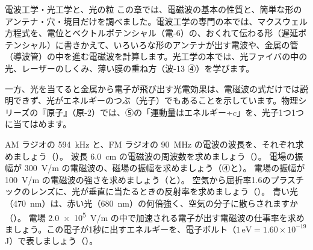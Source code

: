 \begin{phsaki}{電波工学・光工学と、光の粒}
この章では、電磁波の基本の性質と、簡単な形のアンテナ・穴・境目だけを調べました。電波工学の専門の本では、マクスウェル方程式を、電位とベクトルポテンシャル（電-6）の、おくれて伝わる形（遅延ポテンシャル）に書きかえて、いろいろな形のアンテナが出す電波や、金属の管（導波管）の中を進む電磁波を計算します。光工学の本では、光ファイバの中の光、レーザーのしくみ、薄い膜の重ね方（波-13 ④）を学びます。

一方、光を当てると金属から電子が飛び出す光電効果は、電磁波の式だけでは説明できず、光がエネルギーのつぶ（光子）でもあることを示しています。物理シリーズの『原子』（原-2）では、⑤の「運動量はエネルギー÷$c$」を、光子1つ1つに当てはめます。
\end{phsaki}

\bkendproblems
{}
\bkproblem AM ラジオの \qty{594}{kHz} と、FM ラジオの \qty{90}{MHz} の電波の波長を、それぞれ求めましょう（\nobreak{}\nobreak）。
\bkproblem 波長 \qty{6.0}{cm} の電磁波の周波数を求めましょう（\nobreak{}\nobreak）。
\bkproblem 電場の振幅が \qty{300}{V/m} の電磁波の、磁場の振幅を求めましょう（④と\nobreak）。
\bkproblem 電場の振幅が \qty{100}{V/m} の電磁波の強さを求めましょう（\nobreak{}\nobreak と\nobreak）。
\bkproblem 空気から屈折率1.6のプラスチックのレンズに、光が垂直に当たるときの反射率を求めましょう（\nobreak{}\nobreak）。
\bkproblem 青い光（\qty{470}{nm}）は、赤い光（\qty{680}{nm}）の何倍強く、空気の分子に散らされますか（\nobreak{}\nobreak）。
\bkproblem 電場 \qty{2.0e5}{V/m} の中で加速される電子が出す電磁波の仕事率を求めましょう。この電子が1秒に出すエネルギーを、電子ボルト（$1\,\mathrm{eV}=1.60\times10^{-19}$\,J）で表しましょう（\nobreak{}\nobreak）。
